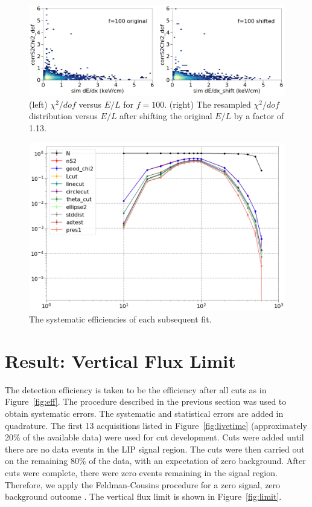 \begin{figure}[htbp]
\begin{center}
\includegraphics[width=\textwidth]{figures/lips/shift_example.png}
\caption{(left) $\chi^{2}/dof$ versus $E/L$ for $f=100$. (right) The resampled $\chi^{2}/dof$ distribution versus $E/L$ after shifting the original $E/L$ by a factor of 1.13.}
\label{fig:shift_example}
\end{center}
\end{figure}
 
 \begin{figure}[htbp]
\begin{center}
\includegraphics[width=\textwidth]{figures/lips/sys_eff.png}
\caption{The systematic efficiencies of each subsequent fit.}
\label{fig:sys_eff}
\end{center}
\end{figure}
 
 
\FloatBarrier
\section{Result: Vertical Flux Limit}
The detection efficiency is taken to be the efficiency after all cuts as in Figure~\ref{fig:eff}. The procedure described in the previous section was used to obtain systematic errors. The systematic and statistical errors are added in quadrature. The first 13 acquisitions listed in Figure~\ref{fig:livetime} (approximately 20\% of the available data) were used for cut development. Cuts were added until there are no data events in the \ac{LIP} signal region. The cuts were then carried out on the remaining 80\% of the data, with an expectation of zero background. After cuts were complete, there were zero events remaining in the signal region. Therefore, we apply the Feldman-Cousins procedure for a zero signal, zero background outcome \cite{Feldman1998}. The vertical flux limit is shown in Figure~\ref{fig:limit}.


